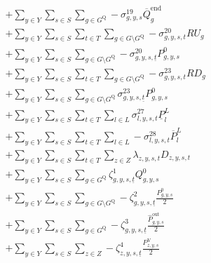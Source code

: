 \documentclass{article}
\newcommand{\sGenerators}{G}
\newcommand{\sStorage}{G^{\mathrm{Q}}}
\newcommand{\sYears}{Y}
\newcommand{\sScenarios}{S}
\newcommand{\sIntervals}{T}
\newcommand{\sZones}{Z}
\newcommand{\sLinks}{L}
\newcommand{\iGenerator}{g}
\newcommand{\iYear}{y}
\newcommand{\iScenario}{s}
\newcommand{\iInterval}{t}
\newcommand{\iIntervalStart}{\underline{\iInterval}}
\newcommand{\iZone}{z}
\newcommand{\iLink}{l}
\newcommand{\cRampRateUp}[1][\iGenerator]{RU_{#1}}
\newcommand{\cRampRateDown}[1][\iGenerator]{RD_{#1}}
\newcommand{\cStorageUnitEnergyIntervalEndMax}[1][\iGenerator]{\overline{Q}^{\mathrm{end}}_{#1}}
\newcommand{\cDemand}[1][\iZone,\iYear,\iScenario,\iInterval]{D_{#1}}
\newcommand{\cPowerFlowMin}{\underline{P}_{\iLink}^{L}}
\newcommand{\cPowerFlowMax}{\overline{P}_{\iLink}^{L}}
\newcommand{\cPowerInitial}[1][\iGenerator,\iYear,\iScenario]{P_{#1}^{0}}
\newcommand{\cPowerOutInitial}[1][\iGenerator,\iYear,\iScenario]{\hat{P}_{#1}^{\mathrm{out}}}
\newcommand{\cStorageEnergyInitial}[1][\iGenerator,\iYear,\iScenario]{Q_{#1}^{0}}
\newcommand{\cLostLoadPowerInitial}[1][\iZone,\iYear,\iScenario]{P_{#1}^{\mathrm{V}}}
\newcommand{\vLostLoadPower}[1][\iZone,\iYear,\iScenario,\iInterval]{p^{\mathrm{V}}_{#1}}
\newcommand{\dMaxStorageEnergyIntervalEnd}[1][\iGenerator,\iYear,\iScenario]{\sigma_{#1}^{19}}
\newcommand{\dRampRateUp}[1][\iGenerator,\iYear,\iScenario,\iInterval]{\sigma_{#1}^{20}}
\newcommand{\dRampRateDown}[1][\iGenerator,\iYear,\iScenario,\iInterval]{\sigma_{#1}^{23}}
\newcommand{\dNonNegativeLostLoad}[1][\iZone,\iYear,\iScenario,\iInterval]{\sigma_{#1}^{26}}
\newcommand{\dMinPowerFlow}[1][\iLink,\iYear,\iScenario,\iInterval]{\sigma_{#1}^{27}}
\newcommand{\dMaxPowerFlow}[1][\iLink,\iYear,\iScenario,\iInterval]{\sigma_{#1}^{28}}
\newcommand{\dPowerBalance}[1][\iZone,\iYear,\iScenario,\iInterval]{\lambda_{#1}}
\newcommand{\dStorageEnergyTransition}[1][\iGenerator,\iYear,\iScenario,\iInterval]{\zeta_{#1}^{1}}
\newcommand{\dGeneratorEnergyOutput}[1][\iGenerator,\iYear,\iScenario,\iInterval]{\zeta_{#1}^{2}}
\newcommand{\dStorageEnergyOutput}[1][\iGenerator,\iYear,\iScenario,\iInterval]{\zeta_{#1}^{3}}
\newcommand{\dLostLoadEnergy}[1][\iZone,\iYear,\iScenario,\iInterval]{\zeta_{#1}^{4}}
\begin{document}
\begin{align}
\begin{split}
& + \sum\limits_{\iYear \in \sYears}\sum\limits_{\iScenario \in \sScenarios} \sum\limits_{\iGenerator \in \sStorage} - \dMaxStorageEnergyIntervalEnd \cStorageUnitEnergyIntervalEndMax\\
& + \sum\limits_{\iYear \in \sYears}\sum\limits_{\iScenario \in \sScenarios}\sum\limits_{\iInterval \in \sIntervals} \sum\limits_{\iGenerator \in \sGenerators \setminus \sStorage} - \dRampRateUp \cRampRateUp\\
& + \sum\limits_{\iYear \in \sYears}\sum\limits_{\iScenario \in \sScenarios} \sum\limits_{\iGenerator \in \sGenerators \setminus \sStorage} - \dRampRateUp[\iGenerator,\iYear,\iScenario,\iIntervalStart] \cPowerInitial\\
& + \sum\limits_{\iYear \in \sYears}\sum\limits_{\iScenario \in \sScenarios}\sum\limits_{\iInterval \in \sIntervals} \sum\limits_{\iGenerator \in \sGenerators \setminus \sStorage} - \dRampRateDown \cRampRateDown\\
& + \sum\limits_{\iYear \in \sYears}\sum\limits_{\iScenario \in \sScenarios} \sum\limits_{\iGenerator \in \sGenerators \setminus \sStorage} \dRampRateDown[\iGenerator,\iYear,\iScenario,\iIntervalStart] \cPowerInitial\\
& + \sum\limits_{\iYear \in \sYears}\sum\limits_{\iScenario \in \sScenarios}\sum\limits_{\iInterval \in \sIntervals} \sum\limits_{\iLink \in \sLinks} \dMinPowerFlow \cPowerFlowMin\\
& + \sum\limits_{\iYear \in \sYears}\sum\limits_{\iScenario \in \sScenarios}\sum\limits_{\iInterval \in \sIntervals} \sum\limits_{\iLink \in \sLinks} - \dMaxPowerFlow \cPowerFlowMax\\
& + \sum\limits_{\iYear \in \sYears}\sum\limits_{\iScenario \in \sScenarios}\sum\limits_{\iInterval \in \sIntervals} \sum\limits_{\iZone \in \sZones} \dPowerBalance \cDemand\\
& + \sum\limits_{\iYear \in \sYears}\sum\limits_{\iScenario \in \sScenarios}\sum\limits_{\iGenerator \in \sStorage} \dStorageEnergyTransition[\iGenerator,\iYear,\iScenario,\iIntervalStart] \cStorageEnergyInitial\\
& + \sum\limits_{\iYear \in \sYears}\sum\limits_{\iScenario \in \sScenarios}\sum\limits_{\iGenerator \in \sGenerators \setminus \sStorage} - \dGeneratorEnergyOutput[\iGenerator, \iYear,\iScenario,\iIntervalStart] \frac{\cPowerInitial}{2}\\
& + \sum\limits_{\iYear \in \sYears}\sum\limits_{\iScenario \in \sScenarios}\sum\limits_{\iGenerator \in \sStorage} - \dStorageEnergyOutput[\iGenerator, \iYear,\iScenario,\iIntervalStart] \frac{\cPowerOutInitial}{2}\\
& + \sum\limits_{\iYear \in \sYears}\sum\limits_{\iScenario \in \sScenarios}\sum\limits_{\iZone \in \sZones} - \dLostLoadEnergy[\iZone, \iYear,\iScenario,\iIntervalStart] \frac{\cLostLoadPowerInitial}{2}\\
\end{split}
\end{align}
\end{document}
